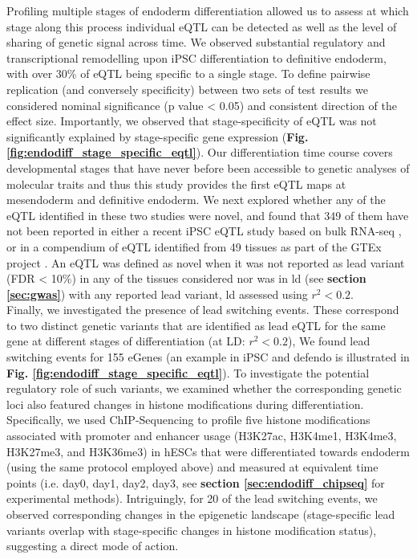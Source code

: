 Profiling multiple stages of endoderm differentiation allowed us to assess at which stage along this process individual eQTL can be detected as well as the level of sharing of genetic signal across time. 
We observed substantial regulatory and transcriptional remodelling upon iPSC differentiation to definitive endoderm, with over 30\% of eQTL being specific to a single stage.
To define pairwise replication (and conversely specificity) between two sets of test results we considered nominal significance (p value < 0.05) and consistent direction of the effect size.
Importantly, we observed that stage-specificity of eQTL was not significantly explained by stage-specific gene expression (\textbf{Fig. \ref{fig:endodiff_stage_specific_eqtl}}).
Our differentiation time course covers developmental stages that have never before been accessible to genetic analyses of molecular traits and thus this study provides the first eQTL maps at mesendoderm and definitive endoderm.
We next explored whether any of the eQTL identified in these two studies were novel, and found that 349 of them have not been reported in either a recent iPSC eQTL study based on bulk RNA-seq \cite{mirauta2018population}, or in a compendium of eQTL identified from 49 tissues as part of the GTEx project \cite{gtex2017genetic}.
An eQTL was defined as novel when it was not reported as lead variant (FDR < 10\%) in any of the tissues considered nor was in \gls{ld} (see \textbf{section \ref{sec:gwas}}) with any reported lead variant, \gls{ld} assessed using $r^2<0.2$.\\

Finally, we investigated the presence of lead switching events.
These correspond to two distinct genetic variants that are identified as lead eQTL for the same gene at different stages of differentiation (at LD: $r^2<0.2$),
We found lead switching events for 155 eGenes (an example in iPSC and defendo is illustrated in \textbf{Fig. \ref{fig:endodiff_stage_specific_eqtl}}). 
To investigate the potential regulatory role of such variants, we examined whether the corresponding genetic loci also featured changes in histone modifications during differentiation. 
Specifically, we used ChIP-Sequencing to profile five histone modifications associated with promoter and enhancer usage (H3K27ac, H3K4me1, H3K4me3, H3K27me3, and H3K36me3) in hESCs that were differentiated towards endoderm (using the same protocol employed above) and measured at equivalent time points (i.e. day0, day1, day2, day3, see \textbf{section \ref{sec:endodiff_chipseq}} for experimental methods). 
Intriguingly, for 20 of the lead switching events, we observed corresponding changes in the epigenetic landscape (stage-specific lead variants overlap with stage-specific changes in histone modification status), suggesting a direct mode of action.

